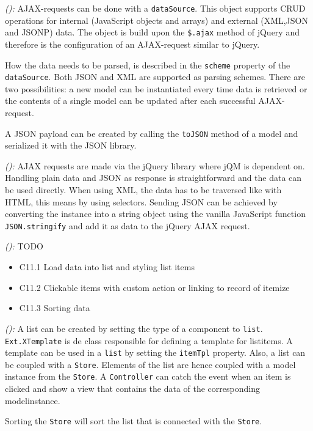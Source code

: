\documentclass[a4paper]{artikel3}
\newcommand{\code}[1]{\texttt{#1}}
\newcommand{\setspace}[0]{\vspace{2mm}}
\renewcommand{\paragraph}[1]{\setspace \noindent {\bf #1}  }
\newcommand{\framework}[2]{ \emph{#1 (\textbf{#2}): }} %
\newcommand{\challenge}[1]{\paragraph{#1}}
\begin{document}
\framework{\kendoa{}}{}
AJAX-requests can be done with a \code{dataSource}.
This object supports CRUD operations for internal (JavaScript objects and arrays) and external (XML,JSON and JSONP) data.
The object is build upon the \code{\$.ajax} method of jQuery and therefore is the configuration of an AJAX-request similar to jQuery.

How the data needs to be parsed, is described in the \code{scheme} property of the \code{dataSource}.
Both JSON and XML are supported as parsing schemes.
There are two possibilities:  a new model can be instantiated every time data is retrieved or the contents of a single model can be updated after each successful AJAX-request.

A JSON payload can be created by calling the \code{toJSON} method of a model and serialized it with the JSON library.

\framework{\jqma{}}{}
AJAX requests are made via the jQuery library where jQM is dependent on.
Handling plain data and JSON as response is straightforward and the data can be used directly.
When using XML, the data has to be traversed like with HTML, this means by using selectors.
Sending JSON can be achieved by converting the instance into a string object using the vanilla JavaScript function \code{JSON.stringify} and add it as data to the jQuery AJAX request.

\framework{\lungoa{}}{}
TODO


\challenge{\chal{lijsten}}
\begin{itemize}
 \item C11.1 Load data into list and styling list items
 \item C11.2 Clickable items with custom action or linking to record of itemize
 \item C11.3 Sorting data
\end{itemize}


\framework{\sta{}}{}
A list can be created by setting the type of a component to \code{list}.
\code{Ext.XTemplate} is de \st{} class responsible for defining a template for listitems.
A template can be used in a \code{list} by setting the \code{itemTpl} property.
Also,  a list can be coupled with a \code{Store}.
Elements of the list are hence coupled with a model instance from the \code{Store}.
A \code{Controller} can catch the event when an item is clicked and show a view that contains the data of the corresponding modelinstance.

Sorting the \code{Store} will sort the list that is connected with the \code{Store}.
\end{document}
